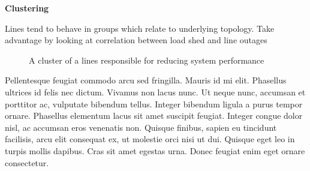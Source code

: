 \textbf{Clustering}

Lines tend to behave in groups which relate to underlying topology.
Take advantage by looking at correlation between load shed and line outages
\begin{figure}
\centering

\caption{A cluster of a lines responsible for reducing system performance}
\label{fig:cluster}
\end{figure}
Pellentesque feugiat commodo arcu sed fringilla. Mauris id mi elit. Phasellus ultrices id felis nec dictum. Vivamus non lacus nunc. Ut neque nunc, accumsan et porttitor ac, vulputate bibendum tellus. Integer bibendum ligula a purus tempor ornare. Phasellus elementum lacus sit amet suscipit feugiat. Integer congue dolor nisl, ac accumsan eros venenatis non. Quisque finibus, sapien eu tincidunt facilisis, arcu elit consequat ex, ut molestie orci nisi ut dui. Quisque eget leo in turpis mollis dapibus. Cras sit amet egestas urna. Donec feugiat enim eget ornare consectetur.
